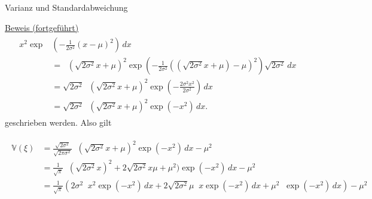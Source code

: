 \documentclass[
  8pt,
  ignorenonframetext,
]{beamer}
\DeclareMathOperator*{\intinf}{\int_{-\infty}^{\infty}}
\begin{document}
\begin{frame}{Varianz und Standardabweichung}
\protect\hypertarget{varianz-und-standardabweichung-4}{}
\footnotesize
{}

\underline{Beweis (fortgeführt)} \begin{align}
\begin{split}
\intinf x^2 \exp & \left(-\frac{1}{2\sigma^2}(x - \mu)^2 \right) \,dx \\
& =
\intinf (\sqrt{2\sigma^2}x + \mu)^2 \exp\left(-\frac{1}{2\sigma^2}((\sqrt{2\sigma^2}x + \mu)-\mu)^2 \right)\sqrt{2\sigma^2}\,dx \\
& =
\sqrt{2\sigma^2}\intinf (\sqrt{2\sigma^2}x + \mu)^2 \exp\left(-\frac{2\sigma^2 x^2}{2\sigma^2} \right)\,dx \\
& =
\sqrt{2\sigma^2}\intinf (\sqrt{2\sigma^2}x + \mu)^2 \exp\left(-x^2\right)\,dx.
\end{split}
\end{align} geschrieben werden. Also gilt

\begin{tiny}
\begin{align*}
\begin{split}
\mathbb{V}(\xi)
& =
\frac{\sqrt{2\sigma^2}}{\sqrt{2\pi\sigma^2}}
\intinf (\sqrt{2\sigma^2}x + \mu)^2 \exp\left(-x^2 \right)\,dx
- \mu^2
\\
&
= \frac{1}{\sqrt{\pi}}
\intinf(\sqrt{2\sigma^2}x)^2 + 2\sqrt{2\sigma^2}x\mu + \mu^2) \exp\left(-x^2 \right)\,dx
- \mu^2
\\
&
= \frac{1}{\sqrt{\pi}}
\left(
        2\sigma^2\intinf x^2 \exp\left(-x^2 \right)\,dx +
        2\sqrt{2\sigma^2}\mu\intinf x\exp\left(-x^2 \right)\,dx +
        \mu^2\intinf \exp\left(-x^2 \right)\,dx
\right)
- \mu^2
\end{split}
\end{align*}
\end{tiny}
\end{frame}
\end{document}
